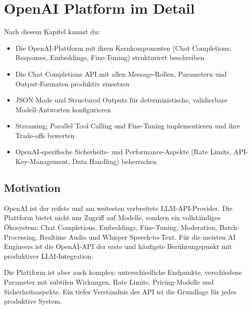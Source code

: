 \chapter{OpenAI Platform im Detail}
\label{chap:openai_platform}

\begin{lernziele}
Nach diesem Kapitel kannst du:
\begin{itemize}
    \item Die OpenAI-Plattform mit ihren Kernkomponenten (Chat Completions, Responses, Embeddings, Fine-Tuning) strukturiert beschreiben
    \item Die Chat Completions API mit allen Message-Rollen, Parametern und Output-Formaten produktiv einsetzen
    \item JSON Mode und Structured Outputs für deterministische, validierbare Modell-Antworten konfigurieren
    \item Streaming, Parallel Tool Calling und Fine-Tuning implementieren und ihre Trade-offs bewerten
    \item OpenAI-spezifische Sicherheits- und Performance-Aspekte (Rate Limits, API-Key-Management, Data Handling) beherrschen
\end{itemize}
\end{lernziele}

\section{Motivation}

OpenAI ist der reifste und am weitesten verbreitete LLM-API-Provider. Die Plattform bietet nicht nur Zugriff auf Modelle, sondern ein vollständiges Ökosystem: Chat Completions, Embeddings, Fine-Tuning, Moderation, Batch-Processing, Realtime Audio und Whisper Speech-to-Text. Für die meisten AI Engineers ist die OpenAI-API der erste und häufigste Berührungspunkt mit produktiver LLM-Integration.

Die Plattform ist aber auch komplex: unterschiedliche Endpunkte, verschiedene Parameter mit subtilen Wirkungen, Rate Limits, Pricing-Modelle und Sicherheitsaspekte. Ein tiefes Verständnis der API ist die Grundlage für jedes produktive System.


